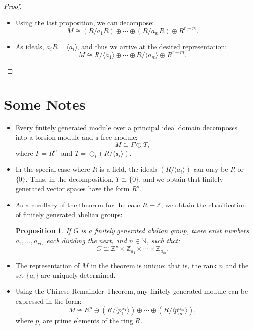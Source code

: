 \documentclass{article}
\newif\ifusemulticols
\theoremstyle{definition}
\theoremstyle{remark}
\theoremstyle{plain}
\theoremstyle{plain}
\newtheorem{prop}[theorem]{Proposition}
\newenvironment{mymulticols}
    { \ifusemulticols \begin{multicols}{2} \fi }
    { \ifusemulticols \end{multicols} \fi }
\newcommand{\N}{\mathbb{N}}
\newcommand{\Z}{\mathbb{Z}}
\begin{document}
\begin{mymulticols}
\begin{proof}
\begin{itemize}
        \item Using the last proposition, we can decompose:
            $$M \cong \left(R / a_1 R\right) \oplus \cdots \oplus \left(R / a_m R\right) \oplus R^{r-m}.$$

        \item As ideals, $a_i R = \langle a_i \rangle$, and thus we arrive at the desired
            representation:
            $$M \cong R / \langle a_1 \rangle \oplus \cdots \oplus R / \langle a_m \rangle \oplus
            R^{r-m}.$$
    \end{itemize}
\end{proof}

\section{Some Notes}%

\begin{itemize}
    \item Every finitely generated module over a principal ideal domain decomposes into a torsion module and a free module: $$M \cong F \oplus T,$$
        where $F = R^n$, and $T = \oplus_i (R / \langle a_i \rangle)$.
    \item In the special case where $R$ is a field, the ideals $(R / \langle a_i \rangle)$ can only
        be $R$ or $\{0\}$. Thus, in the decomposition, $T \cong \{0\}$, and we obtain that finitely
        generated vector spaces have the form $R^n$.
    \item As a corollary of the theorem for the case $R = \Z$, we obtain the classification of
        finitely generated abelian groups:
        \begin{prop}
            If $G$ is a finitely generated abelian group, there exist numbers $a_1, \ldots, a_m$,
            each dividing the next, and $n \in \N$, such that: $$G \cong \Z^n \times \Z_{a_1} \times
            \cdots \times \Z_{a_m}.$$
        \end{prop}
    \item The representation of $M$ in the theorem is unique; that is, the rank $n$ and the set
        $\{a_i\}$ are uniquely determined.
    \item Using the Chinese Remainder Theorem, any finitely generated module can be expressed in the form:
        $$M \cong R^n \oplus (R / \langle p_1^{\alpha_1} \rangle) \oplus \cdots \oplus (R / \langle p_m^{\alpha_m} \rangle),$$
        where $p_i$ are prime elements of the ring $R$.
\end{itemize}


\end{mymulticols}
\end{document}
